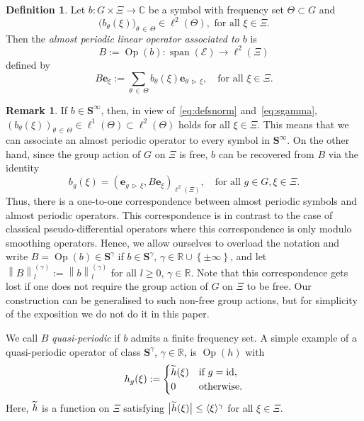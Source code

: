 \documentclass[10pt]{amsart}
\theoremstyle{definition}\newtheorem{defi}[theo]{Definition}\newtheorem{rema}[theo]{Remark}\newtheorem{exam}[theo]{Example}\newtheorem{nota}[theo]{Notation}
\DeclareMathOperator{\spann}{span}
\DeclareMathOperator{\Op}{Op}
\DeclareMathOperator{\id}{id}
\newcommand{\R}{\mathbb R}
\newcommand{\C}{\mathbb C}
\newcommand{\CE}{\mathcal{E}}
\newcommand{\BS}{\mathbf S}
\newcommand{\be}{\mathbf e}
\newcommand{\act}{\triangleright}
\renewcommand{\subseteq}{\subset}
\newcommand{\set}[1]{\left\{ #1 \right\}}
\newcommand{\snorm}[3]{\left\| #1\right\|_{#3}^{(#2)}}
\newcommand{\ang}[1]{\langle #1 \rangle}
\let\oldtilde\tilde
\renewcommand*{\tilde}[1]{\mathchoice{\widetilde{#1}}{\widetilde{#1}}{\oldtilde{#1}}{\oldtilde{#1}}}
\begin{document}
\begin{defi}
Let $b:G\times\Xi\to\C$ be a symbol with frequency set $\Theta\subseteq G$ and
\begin{equation}
\big(b_{\theta}(\xi)\big)_{\theta\,\in\,\Theta}\in \ell^2(\Theta), \text{ for all } \xi\in\Xi.
\end{equation}
Then the \emph{almost periodic linear operator associated to $b$} is
\begin{equation}
B:= \Op(b):\spann(\CE)\to \ell^2(\Xi)
\end{equation}
defined by
\begin{equation}\label{eq:defopB}
B \be_\xi := \sum_{\theta\,\in\,\Theta} b_\theta(\xi) \be_{\theta\,\act\,\xi}, \quad\text{for all }
\xi\in\Xi.
\end{equation}
\end{defi}

\begin{rema}
If $b\in\BS^\infty$, then, in view of~\eqref{eq:defsnorm} and~\eqref{eq:sgamma}, $(b_{\theta}(\xi))_{\theta\,\in\,\Theta}\in \ell^1(\Theta)\subseteq
\ell^2(\Theta)$ holds for all $\xi\in\Xi$. This means that we can associate an almost periodic operator to every symbol in $\BS^\infty$. On the other hand, since the group action of $G$ on $\Xi$ is free, $b$ can be recovered from $B$ via the identity
\begin{equation}\label{eq:symbrecovery}
b_g(\xi)=\left(\be_{g\,\act\,\xi},B\be_\xi\right)_{\ell^2(\Xi)}, \quad\text{for all }g\in G , \xi\in\Xi.
\end{equation}
Thus, there is a one-to-one correspondence between almost periodic symbols and almost periodic operators. This correspondence is in contrast to the case of classical pseudo-differential operators where this correspondence is only modulo smoothing operators. Hence, we allow ourselves to overload the notation and write $B = \Op(b) \in \BS^\gamma$ if $b \in \BS^\gamma$, $\gamma \in \R \cup \set{\pm \infty}$, and let $\snorm B \gamma l := \snorm b
\gamma l$ for all $l \ge 0$, $\gamma \in \R$. Note that this correspondence gets lost if one does not require the group action of $G$ on $\Xi$ to be free. Our construction can be generalised to such non-free group actions, but for simplicity of the exposition we do not do it in this paper.
\end{rema}

We call $B$ \emph{quasi-periodic} if $b$ admits a finite frequency set. A simple example of a quasi-periodic operator of class $\BS^\gamma$, $\gamma\in\R$, is $\Op(h)$ with
\[
h_g(\xi):=
\begin{cases}
\tilde h(\xi) & \text{if } g = \id, \\ 0
&\text{otherwise.}
\end{cases}
\]
Here, $\tilde h$ is a function on $\Xi$ satisfying $\big|\tilde h(\xi)\big| \leq\ang\xi^\gamma$ for all $\xi\in\Xi$.
\end{document}
